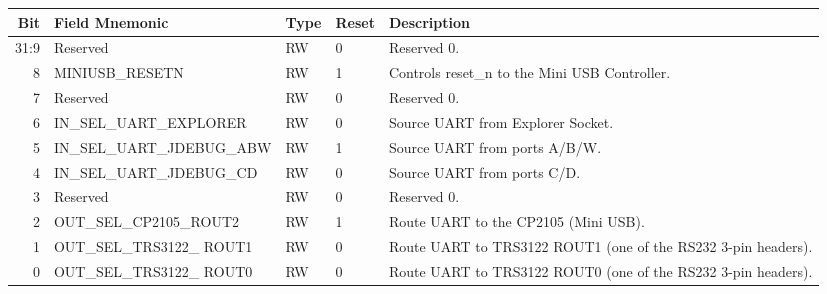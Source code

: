 \begin{tabularx}{\textwidth}{r|l|l|l|X}
  \hline
  Bit   & Field Mnemonic                   & Type & Reset & Description \\ \hline

  31:9  & Reserved                         & RW   & 0     &

  Reserved 0. \\

  8     & MINIUSB\_RESETN                  & RW   & 1     &

  Controls reset\_n to the Mini USB Controller. \\

  7     & Reserved                         & RW   & 0     &

  Reserved 0. \\

  6     & IN\_SEL\_UART\_EXPLORER          & RW   & 0     &

  Source UART from Explorer Socket. \\

  5     & IN\_SEL\_UART\_JDEBUG\_ABW       & RW   & 1     &

  Source UART from ports A/B/W. \\

  4     & IN\_SEL\_UART\_JDEBUG\_CD        & RW   & 0     &

  Source UART from ports C/D. \\

  3     & Reserved                         & RW   & 0     &

  Reserved 0. \\

  2     & OUT\_SEL\_CP2105\_ROUT2          & RW   & 1     &

  Route UART to the CP2105 (Mini USB). \\

  1     & OUT\_SEL\_TRS3122\_ ROUT1        & RW   & 0     &

  Route UART to TRS3122 ROUT1 (one of the RS232 3-pin headers). \\

  0     & OUT\_SEL\_TRS3122\_ ROUT0        & RW   & 0     &

  Route UART to TRS3122 ROUT0 (one of the RS232 3-pin headers). \\
\end{tabularx}

